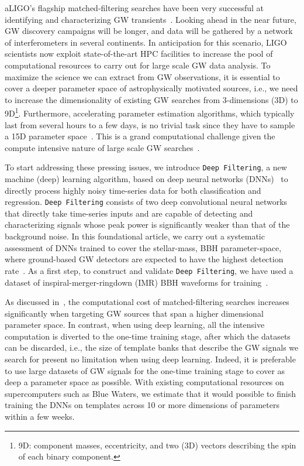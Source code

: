\documentclass[aps,prd,%
amsmath,floats,floatfix, twocolumn, superscriptaddress,nofootinbib,showpacs]{revtex4-1}
\begin{document}
aLIGO's flagship matched-filtering searches have been very successful at identifying and characterizing GW transients~\cite{2016CQGra..33u5004U,2012ApJ...748..136C,D6:2016,corn:2015CQGra}. Looking ahead in the near future, GW discovery campaigns will be longer, and data will be gathered by a network of interferometers in several continents. In anticipation for this scenario, LIGO scientists now exploit state-of-the-art HPC facilities to increase the pool of computational resources to carry out for large scale GW data analysis. To maximize the science we can extract from GW observations, it is essential to cover a deeper parameter space of astrophysically motivated sources, i.e., we need to increase the dimensionality of existing GW searches from 3-dimensions (3D) to 9D\footnote{9D: component masses, eccentricity, and two (3D) vectors describing the spin of each binary component.}. Furthermore, accelerating parameter estimation algorithms, which typically last from several hours to a few days, is no trivial task since they have to sample a 15D parameter space~\cite{Smith:2016PhRvD}. This is a grand computational challenge given the compute intensive nature of large scale GW searches~\cite{2016PhRvD..94b4012H}.  

To start addressing these pressing issues, we introduce \texttt{Deep Filtering}, a new machine (deep) learning algorithm, based on deep neural networks (DNNs)~\cite{DL-Nature} to directly process highly noisy time-series data for both classification and regression. \texttt{Deep Filtering} consists of two deep convolutional neural networks~\cite{ConvNet} that directly take time-series inputs and are capable of detecting and characterizing signals whose peak power is significantly weaker than that of the background noise. In this foundational article, we carry out a systematic assessment of DNNs trained to cover the stellar-mass, BBH parameter-space, where ground-based GW detectors are expected to have the highest detection rate~\cite{bel:2016Na}. As a first step, to construct and validate \texttt{Deep Filtering}, we have used a dataset of inspiral-merger-ringdown (IMR) BBH waveforms for training~\cite{Tara:2014}. 

As discussed in~\cite{2016PhRvD..94b4012H}, the computational cost of matched-filtering searches increases significantly when targeting GW sources that span a higher dimensional parameter space. In contrast, when using deep learning, all the intensive computation is diverted to the one-time training stage, after which the datasets can be discarded, i.e., the size of template banks that describe the GW signals we search for present no limitation when using deep learning. Indeed, it is preferable to use large datasets of GW signals for the one-time training stage to cover as deep a parameter space as possible. With existing computational resources on supercomputers such as Blue Waters, we estimate that it would possible to finish training the DNNs on templates across 10 or more dimensions of parameters within a few weeks.
\end{document}

